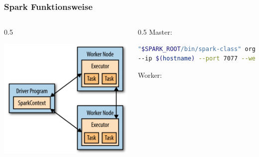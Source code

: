 \begin{frame}[fragile]
    \frametitle{Spark Funktionsweise}
    \begin{columns}\begin{column}{0.5\linewidth}
    \centerline{\includegraphics[width=\linewidth]{spark-components-execution.png}}
    \end{column}\begin{column}{0.5\linewidth}
    Master:
    \begin{lstlisting}[language=bash,numbers=none,xleftmargin=0pt,linewidth=1.05\linewidth,basicstyle=\scriptsize]
"$SPARK_ROOT/bin/spark-class" org.apache.spark.deploy.master.Master \
--ip $(hostname) --port 7077 --webui-port 8080 &
\end{lstlisting}\vspace{-1.5\baselineskip}
    Worker:
    \begin{lstlisting}[language=bash,numbers=none,xleftmargin=0pt,linewidth=1.05\linewidth,basicstyle=\scriptsize]

\end{lstlisting}
\end{column}
\end{columns}
\end{frame}
